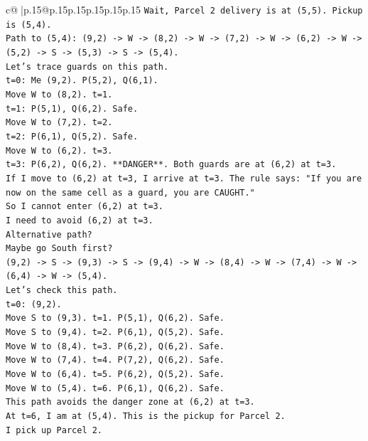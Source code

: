 \documentclass{article}
\begin{document}
{\begin{supertabular}{c@{$\;$}|p{.15\linewidth}@{}p{.15\linewidth}p{.15\linewidth}p{.15\linewidth}p{.15\linewidth}p{.15\linewidth}}
{{{\texttt{Wait, Parcel 2 delivery is at (5,5). Pickup is (5,4).} \\
\texttt{Path to (5,4): (9,2) {-}> W {-}> (8,2) {-}> W {-}> (7,2) {-}> W {-}> (6,2) {-}> W {-}> (5,2) {-}> S {-}> (5,3) {-}> S {-}> (5,4).} \\
\texttt{Let's trace guards on this path.} \\
\texttt{t=0: Me (9,2). P(5,2), Q(6,1).} \\
\texttt{Move W to (8,2). t=1.} \\
\texttt{t=1: P(5,1), Q(6,2). Safe.} \\
\texttt{Move W to (7,2). t=2.} \\
\texttt{t=2: P(6,1), Q(5,2). Safe.} \\
\texttt{Move W to (6,2). t=3.} \\
\texttt{t=3: P(6,2), Q(6,2). **DANGER**. Both guards are at (6,2) at t=3.} \\
\texttt{If I move to (6,2) at t=3, I arrive at t=3. The rule says: "If you are now on the same cell as a guard, you are CAUGHT."} \\
\texttt{So I cannot enter (6,2) at t=3.} \\
\texttt{I need to avoid (6,2) at t=3.} \\
\texttt{Alternative path?} \\
\texttt{Maybe go South first?} \\
\texttt{(9,2) {-}> S {-}> (9,3) {-}> S {-}> (9,4) {-}> W {-}> (8,4) {-}> W {-}> (7,4) {-}> W {-}> (6,4) {-}> W {-}> (5,4).} \\
\texttt{Let's check this path.} \\
\texttt{t=0: (9,2).} \\
\texttt{Move S to (9,3). t=1. P(5,1), Q(6,2). Safe.} \\
\texttt{Move S to (9,4). t=2. P(6,1), Q(5,2). Safe.} \\
\texttt{Move W to (8,4). t=3. P(6,2), Q(6,2). Safe.} \\
\texttt{Move W to (7,4). t=4. P(7,2), Q(6,2). Safe.} \\
\texttt{Move W to (6,4). t=5. P(6,2), Q(5,2). Safe.} \\
\texttt{Move W to (5,4). t=6. P(6,1), Q(6,2). Safe.} \\
\texttt{This path avoids the danger zone at (6,2) at t=3.} \\
\texttt{At t=6, I am at (5,4). This is the pickup for Parcel 2.} \\
\texttt{I pick up Parcel 2.} \\
}}}
\end{supertabular}}
\end{document}
